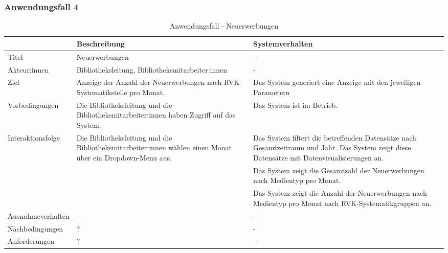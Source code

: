 \subsubsection{Anwendungsfall 4}

\begingroup
\setlength{\tabcolsep}{10pt} %
\renewcommand{\arraystretch}{1.25} 
\begin{table}[H]
    \centering
    \begin{adjustbox}{max width=\textwidth}
    \begin{tabular}{lp{7.0cm}p{7.0cm}}
       \toprule
       \textbf{}          & \textbf{Beschreibung} &\textbf{Systemverhalten}\\
       \midrule
        Titel                            &Neuerwerbungen& -\\
        Akteur:innen                     &Bibliotheksleitung, Bibliotheksmitarbeiter:innen& -\\
        Ziel                             &Anzeige der Anzahl der Neuerwerbungen nach RVK-Systematikstelle pro Monat.& Das System generiert eine Anzeige mit den jeweiligen Parametern\\
        Vorbedingungen                   &Die Bibliotheksleitung und die Bibliotheksmitarbeiter:innen haben Zugriff auf das System.& Das System ist im Betrieb.\\
        Interaktionsfolge                &Die Bibliotheksleitung und die Bibliotheksmitarbeiter:innen wählen einen Monat über ein Dropdown-Menu aus.& Das System filtert die betreffenden Datensätze nach Gesamtzeitraum und Jahr. Das System zeigt diese Datensätze mit Datenvisualisierungen an.\\
                                         & &Das System zeigt die Gesamtzahl der Neuerwerbungen nach Medientyp pro Monat.\\
                                         & &Das System zeigt die Anzahl der Neuerwerbungen nach Medientyp pro Monat nach RVK-Systematikgruppen an.\\
        Ausnahmeverhalten               &- & -\\
        Nachbedingungen                 &?& -\\

        Anforderungen                   &?& -\\
        \bottomrule
    \end{tabular}
    \end{adjustbox}
    \caption{%
    Anwendungsfall - Neuerwerbungen    }
    \label{tab:AF_Neuerwerbungen}
    \end{table}
\endgroup


